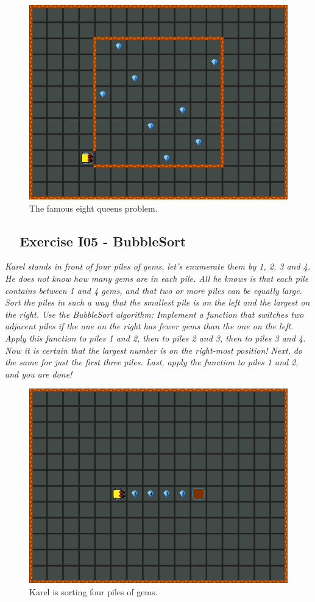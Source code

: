 \documentclass[article,A4,12pt]{llncs}
\begin{document}
{{{{\begin{figure}[!ht]
\begin{center}
\includegraphics[height=0.4\textwidth]{img/i04.png}
\end{center}
\vspace{-4mm}
\caption{The famous eight queens problem.}
\label{fig:g14}
\vspace{-4mm}
\end{figure}
\noindent

\subsection{\ \ Exercise I05 - BubbleSort}

{\em Karel stands in front of four piles of gems, let's enumerate them by 1, 2, 3 and 4. He does not know how many gems are in each pile. All he knows is that each pile contains between 1 and 4 gems, and that two or more piles can be equally large. Sort the piles in such a way that the smallest pile is on the left and the largest on the right. Use the BubbleSort algorithm: Implement a function that switches two adjacent piles if the one on the right has fewer gems than the one on the left. Apply this function to piles 1 and 2, then to piles 2 and 3, then to piles 3 and 4. Now it is certain that the largest number is on the right-most position! Next, do the same for just the first three piles. Last, apply the function to piles 1 and 2, and you are done! }


\begin{figure}[!ht]
\begin{center}
\includegraphics[height=0.4\textwidth]{img/i05.png}
\end{center}
\vspace{-4mm}
\caption{Karel is sorting four piles of gems.}
\label{fig:g13}
\vspace{-4mm}
\end{figure}
\noindent








}}}}
\end{document}
